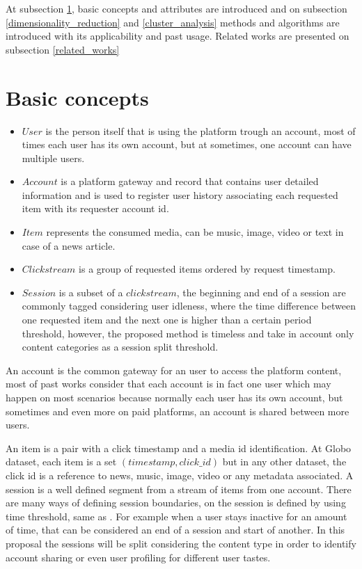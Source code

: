 \documentclass[ecp,tc,english]{iiufrgs}
\begin{document}
At subsection \ref{basic_concepts}, basic concepts and attributes are introduced and on subsection \ref{dimensionality_reduction} and \ref{cluster_analysis} methods and algorithms are introduced with its applicability and past usage. Related works are presented on subsection \ref{related_works}

    \section{Basic concepts} \label{basic_concepts}
        \begin{itemize}
            \item \(User\) is the person itself that is using the platform trough an account, most of times each user has its own account, but at sometimes, one account can have multiple users.        
            \item \(Account\) is a platform gateway and record that contains user detailed information and is used to register user history associating each requested item with its requester account id.
            \item \(Item\) represents the consumed media, can be music, image, video or text in case of a news article.
            \item \(Clickstream\) is a group of requested items ordered by request timestamp.    
            \item \(Session\) is a subset of a \(clickstream\), the beginning and end of a session are commonly tagged considering user idleness, where the time difference between one requested item and the next one is higher than a certain period threshold, however, the proposed method is timeless and take in account only content categories as a session split threshold.
        \end{itemize}

        An account is the common gateway for an user to access the platform content, most of past works consider that each account is in fact one user which may happen on most scenarios because normally each user has its own account, but sometimes and even more on paid platforms, an account is shared between more users.
    
        An item is a pair with a click timestamp and a media id identification. 
        At Globo dataset, each item is a  set \((timestamp, click\_id)\) but 
        in any other dataset, the click id is a reference to news, music, 
        image, video or any metadata associated. A session is a well defined 
        segment from a stream of items from one account. There are many ways 
        of defining session boundaries, on \cite{arlitt2000} the session 
        is defined by using time threshold, same as \cite{halfaker2015}. 
        For example when a user stays inactive for an amount of time, that can be 
        considered an end of a session and start of another. In this proposal the 
        sessions will be split considering the content type in order to identify 
        account sharing or even user profiling for different user tastes.
\end{document}
